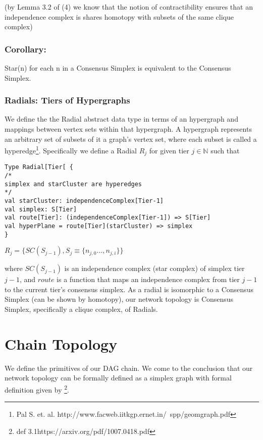 \documentclass{article}
\begin{document}
\begin{center}
(by Lemma 3.2 of (4) we know that the notion of contractibility ensures that an independence complex is shares homotopy with subsets of the same clique complex)
\end{center}

\subsubsection{Corollary:}
Star(n) for each n in a Consensus Simplex is equivalent to the Consensus Simplex.

\subsubsection{Radials: Tiers of Hypergraphs}
We define the the Radial abstract data type in terms of an hypergraph and mappings between vertex sets within that hypergraph. A hypergraph represents an arbitrary set of subsets of it a graph's vertex set, where each subset is called a hyperedge\footnote{Pal S. et. al. http://www.facweb.iitkgp.ernet.in/~spp/geomgraph.pdf}. Specifically we define a Radial $R_j$ for given tier $j \in \mathbb{N}$ such that

\begin{lstlisting}
Type Radial[Tier[ {
/*
simplex and starCluster are hyperedges
*/
val starCluster: independenceComplex[Tier-1]
val simplex: S[Tier]
val route[Tier]: (independenceComplex[Tier-1]) => S[Tier]
val hyperPlane = route[Tier](starCluster) => simplex
}
\end{lstlisting}

\begin{center}
$R_j = \{SC(S_{j-1}), S_j \equiv \{n_{j,0} \dots, n_{j,i}\}\}$
\end{center}

where $SC(S_{j-1})$ is an independence complex (star complex) of simplex tier $j-1$, and $route$ is a function that maps an independence complex from tier $j-1$ to the current tier's consensus simplex. As a radial is isomorphic to a Consensus Simplex (can be shown by homotopy), our network topology is Consensus Simplex, specifically a clique complex, of Radials.

\section{Chain Topology}
We define the primitives of our DAG chain. We come to the conclusion that our network topology can be formally defined as a simplex graph with formal definition given by \footnote{def 3.1https://arxiv.org/pdf/1007.0418.pdf}.
\end{document}
